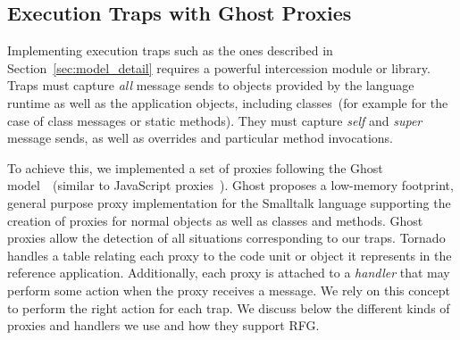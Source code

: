 \subsection{Execution Traps with Ghost Proxies} \label{sec:proxies}

Implementing execution traps such as the ones described in Section~\ref{sec:model_detail} requires a powerful intercession module or library. Traps must capture \emph{all} message sends to objects provided by the language runtime as well as the application objects, including classes~(for example for the case of class messages or static methods). They must capture \emph{self} and \emph{super} message sends, as well as overrides and particular method invocations.

To achieve this, we implemented a set of proxies following the Ghost model~\cite{Mart11a}~(similar to JavaScript proxies~\cite{Vanc10a}). Ghost proposes a low-memory footprint, general purpose proxy implementation for the Smalltalk language supporting the creation of proxies for normal objects as well as classes and methods. 
Ghost proxies allow the detection of all situations corresponding to our traps.
Tornado handles a table relating each proxy to the code unit or object it represents in the reference application.
Additionally, each proxy is attached to a \emph{handler} that may perform some action when the proxy receives a message.
We rely on this concept to perform the right action for each trap.
We discuss below the different kinds of proxies and handlers we use and how they support RFG.

